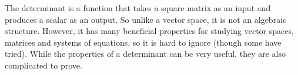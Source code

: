 The determinant is a function that takes a square matrix as an input and produces a scalar as an output.  So unlike a vector space, it is not an algebraic structure.  However, it has many beneficial properties for studying vector spaces, matrices and systems of equations, so it is hard to ignore (though some have tried).  While the properties of a determinant can be very useful, they are also complicated to prove.